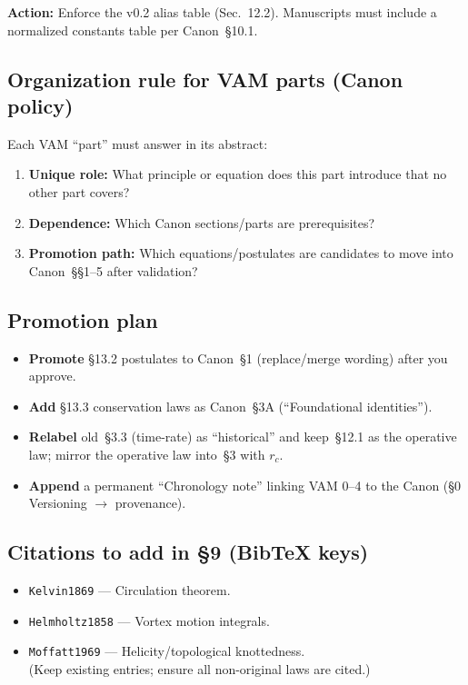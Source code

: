 \documentclass[11pt]{article}
\begin{document}
\textbf{Action:} Enforce the v0.2 alias table (Sec.~12.2). Manuscripts must include a normalized constants table per Canon~\S10.1.

\subsection{Organization rule for VAM parts (Canon policy)}
Each VAM ``part'' must answer in its abstract:
\begin{enumerate}
    \item \textbf{Unique role:} What principle or equation does this part introduce that no other part covers?
    \item \textbf{Dependence:} Which Canon sections/parts are prerequisites?
    \item \textbf{Promotion path:} Which equations/postulates are candidates to move into Canon~\S\S1--5 after validation?
\end{enumerate}

\subsection{Promotion plan}
\begin{itemize}
    \item \textbf{Promote} \S13.2 postulates to Canon~\S1 (replace/merge wording) after you approve.
    \item \textbf{Add} \S13.3 conservation laws as Canon~\S3A (``Foundational identities'').
    \item \textbf{Relabel} old~\S3.3 (time-rate) as ``historical'' and keep~\S12.1 as the operative law; mirror the operative law into~\S3 with $r_c$.
    \item \textbf{Append} a permanent ``Chronology note'' linking VAM 0--4 to the Canon (\S0 Versioning $\rightarrow$ provenance).
\end{itemize}

\subsection{Citations to add in \S9 (BibTeX keys)}
\begin{itemize}
    \item \texttt{Kelvin1869} --- Circulation theorem.
    \item \texttt{Helmholtz1858} --- Vortex motion integrals.
    \item \texttt{Moffatt1969} --- Helicity/topological knottedness.\\
  (Keep existing entries; ensure all non-original laws are cited.)
\end{itemize}
\end{document}
